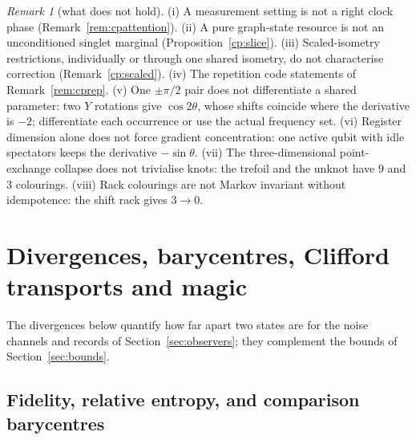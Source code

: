 \documentclass[aps,pra,onecolumn,superscriptaddress,nofootinbib,10pt]{revtex4-2}
\theoremstyle{definition}
\theoremstyle{remark}
\newtheorem{remark}[theorem]{Remark}
\begin{document}
\begin{remark}[what does not hold]\label{rem:cpnogo}
(i) A measurement setting is not a right clock phase (Remark~\ref{rem:cpattention}).  (ii) A pure graph-state resource
is not an unconditioned singlet marginal (Proposition~\ref{cp:slice}).  (iii) Scaled-isometry restrictions,
individually or through one shared isometry, do not characterise correction (Remark~\ref{cp:scaled}).  (iv) The
repetition code statements of Remark~\ref{rem:cprep}.  (v) One $\pm\pi/2$ pair does not differentiate a shared parameter:
two $Y$ rotations give $\cos2\theta$, whose shifts coincide where the derivative is $-2$; differentiate each occurrence or use
the actual frequency set.  (vi) Register dimension alone does not force gradient concentration: one active
qubit with idle spectators keeps the derivative $-\sin\theta$.  (vii) The three-dimensional point-exchange collapse
does not trivialise knots: the trefoil and the unknot have $9$ and $3$ colourings.  (viii) Rack colourings are not
Markov invariant without idempotence: the shift rack gives $3\to0$.
\end{remark}

\section{Divergences, barycentres, Clifford transports and magic}\label{sec:divergences}

The divergences below quantify how far apart two states are for the noise channels and records of
Section~\ref{sec:observers}; they complement the bounds of Section~\ref{sec:bounds}.

\subsection{Fidelity, relative entropy, and comparison barycentres}\label{ob:divergences}
\end{document}
